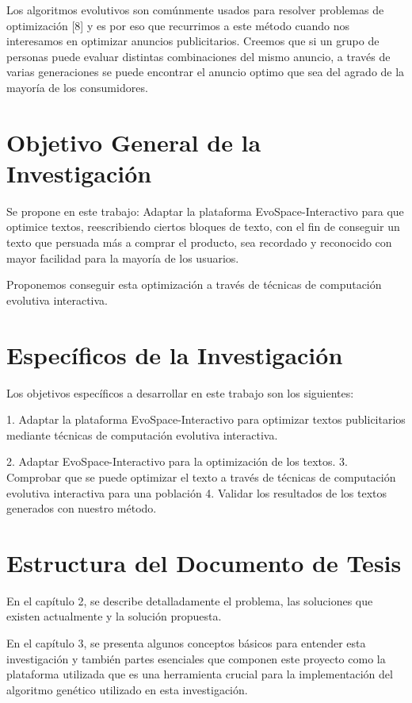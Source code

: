 Los algoritmos evolutivos son comúnmente usados para resolver problemas de optimización [8] y es por eso que recurrimos a este método cuando nos interesamos en optimizar anuncios publicitarios. Creemos que si un grupo de personas puede evaluar distintas combinaciones del mismo anuncio, a través de varias generaciones se puede encontrar el anuncio optimo que sea del agrado de la mayoría de los consumidores.

\section{Objetivo General de la Investigación}

Se propone en este trabajo: Adaptar la plataforma EvoSpace-Interactivo para que optimice textos, reescribiendo ciertos bloques de texto, con el fin de conseguir un texto que persuada más a comprar el producto, sea recordado y reconocido con mayor facilidad para la mayoría de  los usuarios.

Proponemos conseguir esta optimización a través de técnicas de computación evolutiva interactiva.

\section{Específicos de la Investigación}

Los objetivos específicos a desarrollar en este trabajo son los siguientes:

1. Adaptar la plataforma EvoSpace-Interactivo para optimizar textos publicitarios mediante técnicas de computación evolutiva interactiva.

2. Adaptar EvoSpace-Interactivo para la optimización de los textos.
3. Comprobar que se puede optimizar el texto a través de técnicas de computación evolutiva interactiva para una población
4. Validar los resultados de los textos generados con nuestro método.

\section{Estructura del Documento de Tesis}

En el capítulo 2, se describe detalladamente el problema, las soluciones que existen actualmente y la solución propuesta.

En el capítulo 3, se presenta algunos conceptos básicos para entender esta investigación y también partes esenciales que componen este proyecto como la plataforma utilizada que es una herramienta crucial para la implementación del algoritmo genético utilizado en esta investigación.


